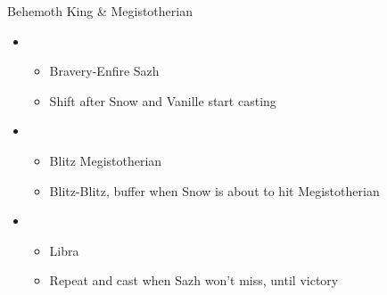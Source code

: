 \begin{battle}[0:26]{Behemoth King \& Megistotherian}
	\begin{itemize}
		\item \fifth
		      \begin{itemize}
			      \item Bravery-Enfire Sazh
			      \item Shift after Snow and Vanille start casting
		      \end{itemize}
		\item \second
		      \begin{itemize}
			      \item Blitz Megistotherian
			      \item Blitz-Blitz, buffer when Snow is about to hit Megistotherian
		      \end{itemize}
		\item \fourth
		      \begin{itemize}
		      	     \item Libra
			      \item Repeat and cast when Sazh won't miss, until victory
		      \end{itemize}
	\end{itemize}
\end{battle}

